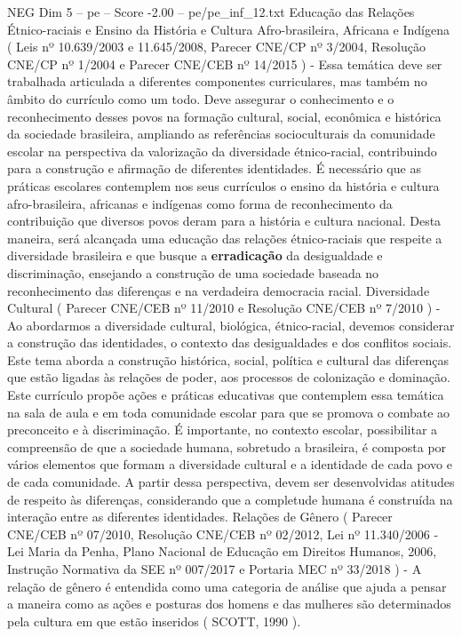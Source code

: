 \begin{textsample}{NEG Dim 5 – pe – Score -2.00 – pe/pe\_inf\_12.txt}
Educação das Relações Étnico-raciais e Ensino da História e Cultura Afro-brasileira, Africana e Indígena ( Leis nº 10.639/2003 e 11.645/2008, Parecer CNE/CP nº 3/2004, Resolução CNE/CP nº 1/2004 e Parecer CNE/CEB nº 14/2015 ) - Essa temática deve ser trabalhada articulada a diferentes componentes curriculares, mas também no âmbito do currículo como um todo.
Deve assegurar o conhecimento e o reconhecimento desses povos na formação cultural, social, econômica e histórica da sociedade brasileira, ampliando as referências socioculturais da comunidade escolar na perspectiva da valorização da diversidade étnico-racial, contribuindo para a construção e afirmação de diferentes identidades.
É necessário que as práticas escolares contemplem nos seus currículos o ensino da história e cultura afro-brasileira, africanas e indígenas como forma de reconhecimento da contribuição que diversos povos deram para a história e cultura nacional.
Desta maneira, será alcançada uma educação das relações étnico-raciais que respeite a diversidade brasileira e que busque a \textbf{erradicação} da desigualdade e discriminação, ensejando a construção de uma sociedade baseada no reconhecimento das diferenças e na verdadeira democracia racial.
Diversidade Cultural ( Parecer CNE/CEB nº 11/2010 e Resolução CNE/CEB nº 7/2010 ) - Ao abordarmos a diversidade cultural, biológica, étnico-racial, devemos considerar a construção das identidades, o contexto das desigualdades e dos conflitos sociais.
Este tema aborda a construção histórica, social, política e cultural das diferenças que estão ligadas às relações de poder, aos processos de colonização e dominação.
Este currículo propõe ações e práticas educativas que contemplem essa temática na sala de aula e em toda comunidade escolar para que se promova o combate ao preconceito e à discriminação.
É importante, no contexto escolar, possibilitar a compreensão de que a sociedade humana, sobretudo a brasileira, é composta por vários elementos que formam a diversidade cultural e a identidade de cada povo e de cada comunidade.
A partir dessa perspectiva, devem ser desenvolvidas atitudes de respeito às diferenças, considerando que a completude humana é construída na interação entre as diferentes identidades.
Relações de Gênero ( Parecer CNE/CEB nº 07/2010, Resolução CNE/CEB nº 02/2012, Lei nº 11.340/2006 - Lei Maria da Penha, Plano Nacional de Educação em Direitos Humanos, 2006, Instrução Normativa da SEE nº 007/2017 e Portaria MEC nº 33/2018 ) - A relação de gênero é entendida como uma categoria de análise que ajuda a pensar a maneira como as ações e posturas dos homens e das mulheres são determinados pela cultura em que estão inseridos ( SCOTT, 1990 ).

\end{textsample}
